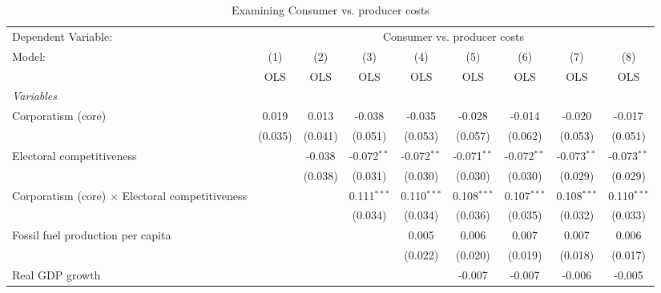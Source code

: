 
\begin{table}[htbp]
   \caption{Examining Consumer vs. producer costs}
   \centering
   \begin{tabular}{lcccccccc}
      \toprule
      Dependent Variable: & \multicolumn{8}{c}{Consumer vs. producer costs}\\
      Model:                                                 & (1)     & (2)     & (3)           & (4)           & (5)           & (6)           & (7)           & (8)\\  
                                                             &  OLS    & OLS     & OLS           & OLS           & OLS           & OLS           & OLS           & OLS\\  
      \midrule
      \emph{Variables}\\
      Corporatism (core)                                     & 0.019   & 0.013   & -0.038        & -0.035        & -0.028        & -0.014        & -0.020        & -0.017\\   
                                                             & (0.035) & (0.041) & (0.051)       & (0.053)       & (0.057)       & (0.062)       & (0.053)       & (0.051)\\   
      Electoral competitiveness                              &         & -0.038  & -0.072$^{**}$ & -0.072$^{**}$ & -0.071$^{**}$ & -0.072$^{**}$ & -0.073$^{**}$ & -0.073$^{**}$\\   
                                                             &         & (0.038) & (0.031)       & (0.030)       & (0.030)       & (0.030)       & (0.029)       & (0.029)\\   
      Corporatism (core) $\times$ Electoral competitiveness  &         &         & 0.111$^{***}$ & 0.110$^{***}$ & 0.108$^{***}$ & 0.107$^{***}$ & 0.108$^{***}$ & 0.110$^{***}$\\   
                                                             &         &         & (0.034)       & (0.034)       & (0.036)       & (0.035)       & (0.032)       & (0.033)\\   
      Fossil fuel production per capita                      &         &         &               & 0.005         & 0.006         & 0.007         & 0.007         & 0.006\\   
                                                             &         &         &               & (0.022)       & (0.020)       & (0.019)       & (0.018)       & (0.017)\\   
      Real GDP growth                                        &         &         &               &               & -0.007        & -0.007        & -0.006        & -0.005\\   

\end{tabular}
\end{table}
